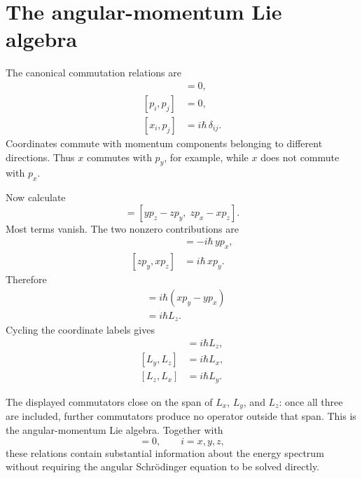 \section{The angular-momentum Lie algebra}

The canonical commutation relations are
\begin{align}
[x_i,x_j]&=0,\\
[p_i,p_j]&=0,\\
[x_i,p_j]&=i\hbar\,\delta_{ij}.
\end{align}
Coordinates commute with momentum components belonging to different directions. Thus \(x\) commutes with \(p_y\), for example, while \(x\) does not commute with \(p_x\).

Now calculate
\begin{equation}
[L_x,L_y]
=
[yp_z-zp_y,\;zp_x-xp_z].
\end{equation}
Most terms vanish. The two nonzero contributions are
\begin{align}
[yp_z,zp_x]&=-i\hbar\,yp_x,\\
[zp_y,xp_z]&=i\hbar\,xp_y.
\end{align}
Therefore
\begin{align}
[L_x,L_y]
&=i\hbar\left(xp_y-yp_x\right)\\
&=i\hbar L_z.
\end{align}
Cycling the coordinate labels gives
\begin{align}
[L_x,L_y]&=i\hbar L_z,\\
[L_y,L_z]&=i\hbar L_x,\\
[L_z,L_x]&=i\hbar L_y.
\end{align}

\begin{classroomqa}
\end{classroomqa}

The displayed commutators close on the span of \(L_x\), \(L_y\), and \(L_z\): once all three are included, further commutators produce no operator outside that span. This is the angular-momentum Lie algebra. Together with
\begin{equation}
[H,L_i]=0,
\qquad i=x,y,z,
\end{equation}
these relations contain substantial information about the energy spectrum without requiring the angular Schr\"odinger equation to be solved directly.

